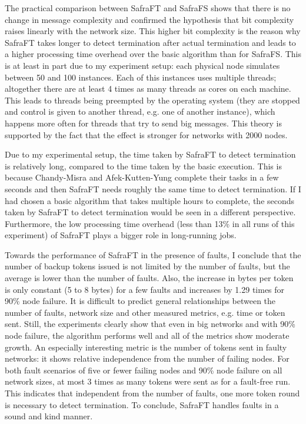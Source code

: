 The practical comparison between SafraFT and SafraFS shows that there is no change in message complexity and confirmed the hypothesis that bit complexity raises linearly with the network size.
This higher bit complexity is the reason why SafraFT takes longer to detect termination after actual termination and leads to a higher processing time overhead over the basic algorithm than for SafraFS.
This is at least in part due to my experiment setup: each physical node simulates between 50 and 100 instances.
Each of this instances uses multiple threads; altogether there are at least 4 times as many threads as cores on each machine.
This leads to threads being preempted by the operating system (they are stopped and control is given to another thread, e.g. one of another instance), which happens more often for threads that try to send big messages.
This theory is supported by the fact that the effect is stronger for networks with 2000 nodes.

Due to my experimental setup, the time taken by SafraFT to detect termination is relatively long, compared to the time taken by the basic execution.
This is because Chandy-Misra and Afek-Kutten-Yung complete their tasks in a few seconds and then SafraFT needs roughly the same time to detect termination.
If I had chosen a basic algorithm that takes multiple hours to complete, the seconds taken by SafraFT to detect termination would be seen in a different perspective.
Furthermore, the low processing time overhead (less than 13\% in all runs of this experiment)  %
of SafraFT plays a bigger role in long-running jobs.

Towards the performance of SafraFT in the presence of faults, I conclude that the number of backup tokens issued is not limited by the number of faults, but the average is lower than the number of faults.
Also, the increase in bytes per token is only constant (5 to 8 bytes) for a few faults and increases by 1.29 times for 90\% node failure.  %
It is difficult to predict general relationships between the number of faults, network size and other measured metrics, e.g. time or token sent.
Still, the experiments clearly show that even in big networks and with 90\% node failure, the algorithm performs well and all of the metrics show moderate growth.
An especially interesting metric is the number of tokens sent in faulty networks: it shows relative independence from the number of failing nodes.
For both fault scenarios of five or fewer failing nodes and 90\% node failure on all network sizes, at most 3 times as many tokens were sent as for a fault-free run. %
This indicates that independent from the number of faults, one more token round is necessary to detect termination.
To conclude, SafraFT handles faults in a sound and kind manner.

